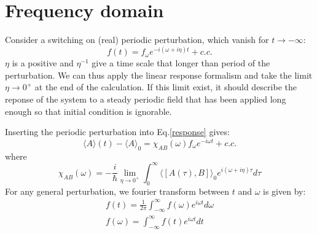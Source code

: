 \documentclass{article}
\begin{document}
\section{Frequency domain}
Consider a switching on (real) periodic perturbation, which vanish for $t \to -\infty$:
\begin{equation}
    f(t) = f_{\omega}e^{-i(\omega + i\eta) t} + c.c.
\end{equation}
$\eta$ is a positive and $\eta^{-1}$ give a time scale that longer than period of the perturbation.
We can thus apply the linear response formalism and take the limit $\eta \to 0^+$ at the 
end of the calculation. If this limit exist, it should describe the reponse of the 
system to a steady periodic field that has been applied long enough so that initial 
condition is ignorable.

Inserting the periodic perturbation into Eq.\ref{response} gives:
\begin{equation}
    \langle A\rangle(t) - \langle A\rangle_0 = \chi_{AB}(\omega) f_{\omega} e^{-i\omega t} + c.c.
\end{equation}
where 
\begin{equation}
    \chi_{AB}(\omega) = -\frac{i}{\hbar} \lim_{\eta\to 0^+} \int_{0}^{\infty} \langle [ A(\tau), B ] \rangle_0 e^{i(\omega+i\eta)\tau} d\tau
\end{equation}
For any general perturbation, we fourier transform between $t$ and $\omega$ is given by:
\begin{gather}
    f(t) = \frac{1}{2\pi} \int_{-\infty}^{\infty} f(\omega) e^{i\omega t} d\omega \\
    f(\omega) = \int_{-\infty}^{\infty} f(t) e^{i\omega t} dt
\end{gather}
\end{document}
